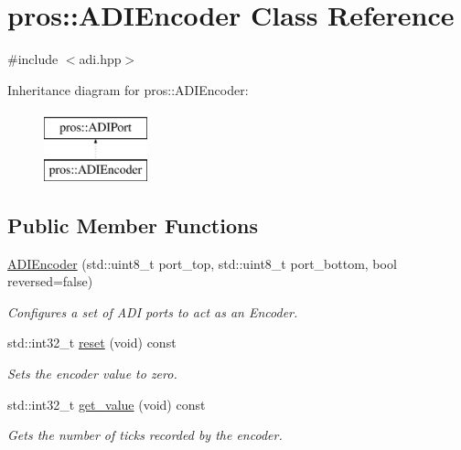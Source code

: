 \hypertarget{classpros_1_1ADIEncoder}{}\section{pros\+:\+:A\+D\+I\+Encoder Class Reference}
\label{classpros_1_1ADIEncoder}


{\ttfamily \#include $<$adi.\+hpp$>$}

Inheritance diagram for pros\+:\+:A\+D\+I\+Encoder\+:\begin{figure}[H]
\begin{center}
\leavevmode
\includegraphics[height=2.000000cm]{classpros_1_1ADIEncoder}
\end{center}
\end{figure}
\subsection*{Public Member Functions}
\begin{DoxyCompactItemize}
\item 
\hyperlink{classpros_1_1ADIEncoder_a927287940aedad3ea67f292908c623f7}{A\+D\+I\+Encoder} (std\+::uint8\+\_\+t port\+\_\+top, std\+::uint8\+\_\+t port\+\_\+bottom, bool reversed=false)
\begin{DoxyCompactList}\small\item\em Configures a set of A\+DI ports to act as an Encoder. \end{DoxyCompactList}\item 
std\+::int32\+\_\+t \hyperlink{classpros_1_1ADIEncoder_a38a555946a841150b203f940b4b44cc8}{reset} (void) const
\begin{DoxyCompactList}\small\item\em Sets the encoder value to zero. \end{DoxyCompactList}\item 
std\+::int32\+\_\+t \hyperlink{classpros_1_1ADIEncoder_acb4c087c7318028db25ae39dabb64700}{get\+\_\+value} (void) const
\begin{DoxyCompactList}\small\item\em Gets the number of ticks recorded by the encoder. \end{DoxyCompactList}\end{DoxyCompactItemize}


